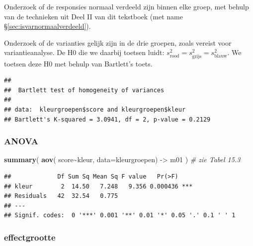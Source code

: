 \documentclass[
]{book}
\newenvironment{Shaded}{\begin{snugshade}}{\end{snugshade}}
\newcommand{\AttributeTok}[1]{\textcolor[rgb]{0.13,0.29,0.53}{#1}}
\newcommand{\CommentTok}[1]{\textcolor[rgb]{0.56,0.35,0.01}{\textit{#1}}}
\newcommand{\FunctionTok}[1]{\textcolor[rgb]{0.13,0.29,0.53}{\textbf{#1}}}
\newcommand{\NormalTok}[1]{#1}
\newcommand{\OtherTok}[1]{\textcolor[rgb]{0.56,0.35,0.01}{#1}}
\newcommand{\SpecialCharTok}[1]{\textcolor[rgb]{0.81,0.36,0.00}{\textbf{#1}}}
\begin{document}
Onderzoek of de responsies normaal verdeeld zijn binnen elke groep, met behulp van de
technieken uit Deel II van dit tekstboek (met name
§\ref{sec:isvarnormaalverdeeld}).

Onderzoek of de varianties gelijk zijn in de drie groepen, zoals vereist
voor variantieanalyse. De H0 die we daarbij toetsen luidt:
\(s^2_\textrm{rood} = s^2_\textrm{grijs} = s^2_\textrm{blauw}\). We
toetsen deze H0 met behulp van Bartlett's toets.

\begin{Shaded}
\end{Shaded}

\begin{verbatim}
## 
##  Bartlett test of homogeneity of variances
## 
## data:  kleurgroepen$score and kleurgroepen$kleur
## Bartlett's K-squared = 3.0941, df = 2, p-value = 0.2129
\end{verbatim}

\subsubsection{ANOVA}\label{anova-2}

\begin{Shaded}
\begin{Highlighting}[]
\FunctionTok{summary}\NormalTok{( }\FunctionTok{aov}\NormalTok{( score}\SpecialCharTok{\textasciitilde{}}\NormalTok{kleur, }\AttributeTok{data=}\NormalTok{kleurgroepen) }\OtherTok{{-}\textgreater{}}\NormalTok{ m01 ) }\CommentTok{\# zie Tabel 15.3}
\end{Highlighting}
\end{Shaded}

\begin{verbatim}
##             Df Sum Sq Mean Sq F value   Pr(>F)    
## kleur        2  14.50   7.248   9.356 0.000436 ***
## Residuals   42  32.54   0.775                     
## ---
## Signif. codes:  0 '***' 0.001 '**' 0.01 '*' 0.05 '.' 0.1 ' ' 1
\end{verbatim}

\subsubsection{effectgrootte}\label{R:omega-kwadraat}
\end{document}
